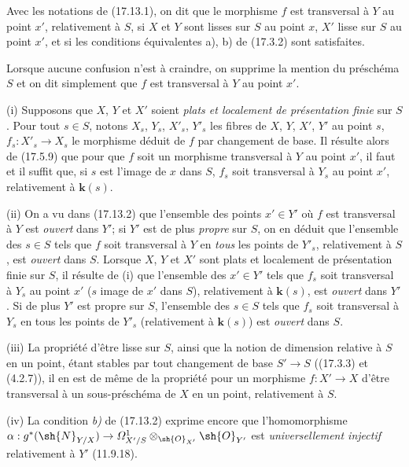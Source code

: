 \begin{definition}[17.13.3]
Avec les notations de \textup{(17.13.1)}, on dit que le morphisme $f$ est transversal à $Y$ au point $x'$, relativement à $S$, si $X$ et $Y$ sont lisses sur $S$ au point $x$, $X'$ lisse sur $S$ au point $x'$, et si les conditions équivalentes \textup{a), b)} de \textup{(17.3.2)} sont satisfaites.
\end{definition}

Lorsque aucune confusion n'est à craindre, on supprime la mention du préschéma $S$ et on dit simplement que $f$ est transversal à $Y$ au point $x'$.

\begin{remarks}[17.13.4]
\label{IV.17.13.4}
(i) Supposons que $X$, $Y$ et $X'$ soient \emph{plats et localement de présentation finie} sur $S$. Pour tout $s\in S$, notons $X_s$, $Y_s$, $X'_s$, $Y'_s$ les fibres de $X$, $Y$, $X'$, $Y'$ au point $s$, $f_s:X'_s\to X_s$ le morphisme déduit de $f$ par changement de base. Il résulte alors de (17.5.9) que pour que $f$ soit un morphisme transversal à $Y$ au point $x'$, il faut et il suffit que, si $s$ est l'image de $x$ dans $S$, $f_s$ soit transversal à $Y_s$ au point $x'$, relativement à $\boldsymbol{k}(s)$.

(ii) On a vu dans (17.13.2) que l'ensemble des points $x'\in Y'$ où $f$ est transversal à $Y$ est \emph{ouvert} dans $Y'$; si $Y'$ est de plus \emph{propre} sur $S$, on en déduit que l'ensemble des $s\in S$ tels que $f$ soit transversal à $Y$ en \emph{tous} les points de $Y'_s$, relativement à $S$, est \emph{ouvert} dans $S$.
Lorsque $X$, $Y$ et $X'$ sont plats et localement de présentation finie sur $S$, il résulte de (i) que l'ensemble des $x'\in Y'$ tels que $f_s$ soit transversal à $Y_s$ au point $x'$ ($s$ image de $x'$ dans $S$), relativement à $\boldsymbol{k}(s)$, est \emph{ouvert} dans $Y'$. Si de plus $Y'$ est propre sur $S$, l'ensemble des $s\in S$ tels que $f_s$ soit transversal à $Y_s$ en tous les points de $Y'_s$ (relativement à $\boldsymbol{k}(s)$) est \emph{ouvert} dans $S$.

(iii) La propriété d'être lisse sur $S$, ainsi que la notion de dimension relative à $S$ en un point, étant stables par tout changement de base $S'\to S$ ((17.3.3) et (4.2.7)), il en est de même de la propriété pour un morphisme $f:X'\to X$ d'être transversal à un sous-préschéma de $X$ en un point, relativement à $S$.


(iv) La condition \emph{b)} de (17.13.2) exprime encore que l'homomorphisme $\alpha:g^*(\sh{N}_{Y/X})\to\varOmega^1_{X'/S}\otimes_{\sh{O}_{X'}}\sh{O}_{Y'}$ est \emph{universellement injectif} relativement à $Y'$ (11.9.18).
\end{remarks}

